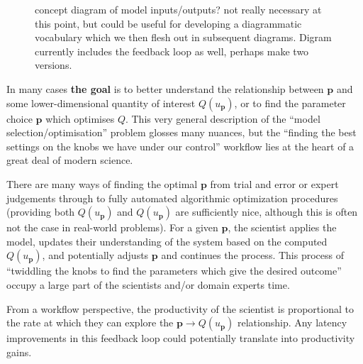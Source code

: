 \documentclass[a4paper,fontsize=12pt]{scrartcl}
\begin{document}
\begin{figure}[h!]
\centering

\caption{concept diagram of model inputs/outputs? not really
  necessary at this point, but could be useful for developing a
  diagrammatic vocabulary which we then flesh out in subsequent
  diagrams. Digram currently includes the feedback loop as well, 
  perhaps make two versions.}
\end{figure}

In many cases \textbf{the goal} is to better understand the
relationship between $\mathbf{p}$ and some lower-dimensional
quantity of interest $Q(u_{\mathbf{p}})$, or to find the
parameter choice $\mathbf{p}$ which optimises $Q$. %
This very general description of the ``model
selection/optimisation'' problem glosses many nuances, but the
``finding the best settings on the knobs we have under our control''
workflow lies at the heart of a great deal of modern science.

There are many ways of finding the optimal $\mathbf{p}$ from trial and
error or expert judgements through to fully automated algorithmic
optimization procedures (providing both $Q(u_{\mathbf{p}})$ and
$Q(u_{\mathbf{p}})$ are sufficiently nice, although this is often not
the case in real-world problems). For a given $\mathbf{p}$, the
scientist applies the model, updates their understanding of the system
based on the computed $Q(u_{\mathbf{p}})$, and potentially adjusts
$\mathbf{p}$ and continues the process. This process of ``twiddling
the knobs to find the parameters which give the desired outcome''
occupy a large part of the scientists and/or domain experts time.

From a workflow perspective, the productivity of the scientist is
proportional to the rate at which they can explore the
$\mathbf{p} \rightarrow Q(u_{\mathbf{p}})$ relationship. Any latency
improvements in this feedback loop could potentially translate into
productivity gains.

\end{document}
